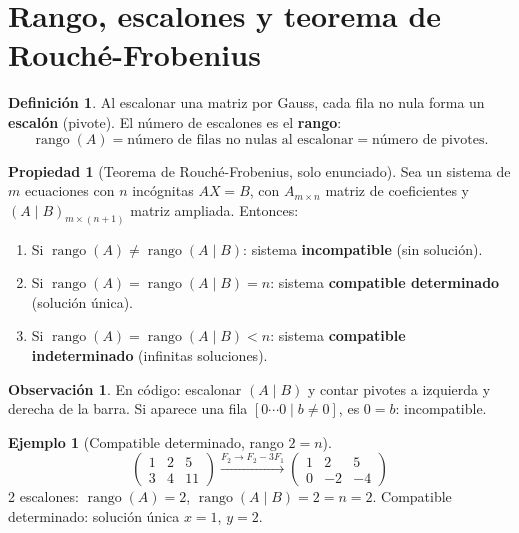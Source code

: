 \documentclass[a4paper,12pt]{article}
\theoremstyle{definition}
\newtheorem{definicion}{Definición}[section]
\newtheorem{ejemplo}{Ejemplo}[section]
\newtheorem{propiedad}{Propiedad}[section]
\newtheorem{observacion}{Observación}[section]
\begin{document}
\section{Rango, escalones y teorema de Rouch\'e-Frobenius}
\begin{definicion}
Al escalonar una matriz por Gauss, cada fila no nula forma un \textbf{escal\'on} (pivote). El n\'umero de escalones es el \textbf{rango}:
\[
\operatorname{rango}(A) = \text{n\'umero de filas no nulas al escalonar} = \text{n\'umero de pivotes}.
\]
\end{definicion}

\begin{propiedad}[Teorema de Rouch\'e-Frobenius, solo enunciado]
Sea un sistema de $m$ ecuaciones con $n$ inc\'ognitas $AX=B$, con $A_{m \times n}$ matriz de coeficientes y $(A\mid B)_{m \times (n+1)}$ matriz ampliada. Entonces:
\begin{enumerate}[label=\arabic*.]
\item Si $\operatorname{rango}(A) \neq \operatorname{rango}(A\mid B)$: sistema \textbf{incompatible} (sin soluci\'on).
\item Si $\operatorname{rango}(A) = \operatorname{rango}(A\mid B) = n$: sistema \textbf{compatible determinado} (soluci\'on \'unica).
\item Si $\operatorname{rango}(A) = \operatorname{rango}(A\mid B) < n$: sistema \textbf{compatible indeterminado} (infinitas soluciones).
\end{enumerate}
\end{propiedad}

\begin{observacion}
En c\'odigo: escalonar $(A\mid B)$ y contar pivotes a izquierda y derecha de la barra. Si aparece una fila $[0\cdots 0\mid b\neq 0]$, es $0=b$: incompatible.
\end{observacion}

\begin{ejemplo}[Compatible determinado, rango $2=n$]
\[
\left(\begin{array}{cc|c}
1 & 2 & 5 \\
3 & 4 & 11
\end{array}\right)
\xrightarrow{F_2 \to F_2-3F_1}
\left(\begin{array}{cc|c}
1 & 2 & 5 \\
0 & -2 & -4
\end{array}\right)
\]
2 escalones: $\operatorname{rango}(A)=2$, $\operatorname{rango}(A\mid B)=2=n=2$. Compatible determinado: soluci\'on \'unica $x=1$, $y=2$.
\end{ejemplo}
\end{document}
